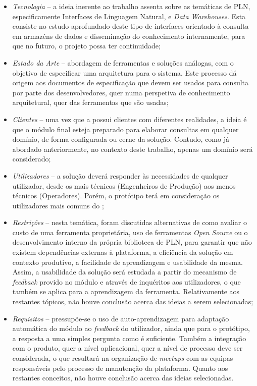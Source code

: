 \begin{itemize}
    \item
    {
        \textit{Tecnologia} -- a ideia inerente ao trabalho assenta sobre as temáticas de \gls{PLN}, especificamente Interfaces de Linguagem Natural, e \textit{Data Warehouses}. Esta consiste no estudo aprofundado deste tipo de interfaces orientado à consulta em armazéns de dados e disseminação do conhecimento internamente, para que no futuro, o projeto possa ter continuidade;
    }
    \item
    {
        \textit{Estado da Arte} -- abordagem de ferramentas e soluções análogas, com o objetivo de especificar uma arquitetura para o sistema. Este processo dá origem aos documentos de especificação que devem ser usados para consulta por parte dos desenvolvedores, quer numa perspetiva de conhecimento arquitetural, quer das ferramentas que são usadas;
    }
    \item
    {
        \textit{Clientes} -- uma vez que a {\companyname} possui clientes com diferentes realidades, a ideia é que o módulo final esteja preparado para elaborar consultas em qualquer domínio, de forma configurada ou cerne da solução. Contudo, como já abordado anteriormente, no contexto deste trabalho, apenas um domínio será considerado;
    }
    \item
    {
        \textit{Utilizadores} -- a solução deverá responder às necessidades de qualquer utilizador, desde os mais técnicos (Engenheiros de Produção) aos menos técnicos (Operadores). Porém, o protótipo terá em consideração os utilizadores mais comuns do {\productname};
    }
    \item
    {
        \textit{Restrições} -- nesta temática, foram discutidas alternativas de como avaliar o custo de uma ferramenta proprietária, uso de ferramentas \textit{Open Source} ou o desenvolvimento interno da própria biblioteca de \gls{PLN}, para garantir que não existem dependências externas à plataforma, a eficiência da solução em contexto produtivo, a facilidade de aprendizagem e usabilidade da mesma. Assim, a usabilidade da solução será estudada a partir do mecanismo de \textit{feedback} provido no módulo e através de inquéritos aos utilizadores, o que também se aplica para a aprendizagem da ferramenta. Relativamente aos restantes tópicos, não houve conclusão acerca das ideias a serem selecionadas;
    }
    \item
    {
        \textit{Requisitos} -- pressupõe-se o uso de auto-aprendizagem para adaptação automática do módulo ao \textit{feedback} do utilizador, ainda que para o protótipo, a resposta a uma simples pergunta como  é suficiente. Também a integração com o produto, quer a nível aplicacional, quer a nível de processo deve ser considerada, o que resultará na organização de \textit{meetups} com as equipas responsáveis pelo processo de manutenção da plataforma. Quanto aos restantes conceitos, não houve conclusão acerca das ideias selecionadas.
    }
\end{itemize}

